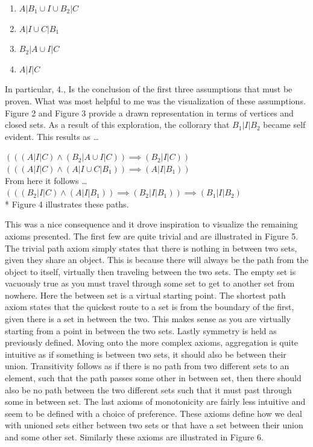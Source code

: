 \documentclass[a4paper,man,natbib]{apa6}
\begin{document}
\begin{enumerate}

      \item $ A | B_1 \cup I \cup B_2 | C $

      \item $ A | I \cup C | B_1 $

      \item $ B_2 | A \cup I | C $

      \item $ A | I | C $

\end{enumerate}

\noindent
In particular, 4., Is the conclusion of the first three assumptions that must be proven.
What was most helpful to me was the visualization of these assumptions.
Figure 2 and Figure 3 provide a drawn representation in terms of vertices and closed sets.
As a result of this exploration, the collorary that $ B_1 | I | B_2 $ became self evident.
This results as \dots

\begin{center}

      $ (((A | I | C) \land (B_2 | A \cup I | C)) \implies (B_2 | I | C)) $ \\
      $ (((A | I | C) \land (A | I \cup C | B_1)) \implies (A | I | B_1)) $ \\
      From here it follows \dots \\
      $ (((B_2 | I | C) \land (A | I | B_1)) \implies (B_2 | I | B_1)) \implies (B_1 | I | B_2) $ \\
      * Figure 4 illustrates these paths.

\end{center}

This was a nice consequence and it drove inspiration to visualize the remaining axioms presented.
The first few are quite trivial and are illustrated in Figure 5.
The trivial path axiom simply states that there is nothing in between two sets, given they share an object.
This is because there will always be the path from the object to itself, virtually then traveling between the two sets.
The empty set is vacuously true as you must travel through some set to get to another set from nowhere.
Here the between set is a virtual starting point.
The shortest path axiom states that the quickest route to a set is from the boundary of the first, given there is a set in between the two.
This makes sense as you are virtually starting from a point in between the two sets.
Lastly symmetry is held as previously defined.
Moving onto the more complex axioms, aggregation is quite intuitive as if something is between two sets, it should also be between their union.
Transitivity follows as if there is no path from two different sets to an element, such that the path passes some other in between set, then there should also be no path between the two different sets such that it must past through some in between set.
The last axioms of monotonicity are fairly less intuitive and seem to be defined with a choice of preference. These axioms define how we deal with unioned sets either between two sets or that have a set between their union and some other set.
Similarly these axioms are illustrated in Figure 6.
\end{document}

